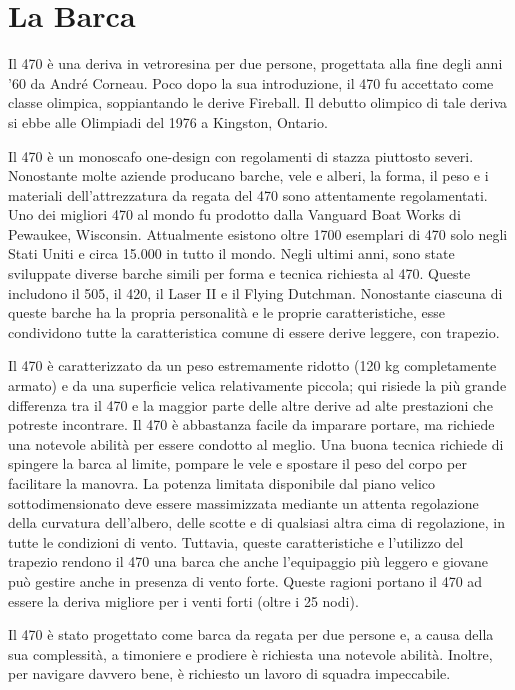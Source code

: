
\section{La Barca}
\label{sec:LaBarca}
Il 470 è una deriva in vetroresina per due persone, progettata alla fine degli
anni '60 da André Corneau. Poco dopo la sua introduzione, il 470 fu accettato
come classe olimpica, soppiantando le derive Fireball. Il
debutto olimpico di tale deriva si ebbe alle Olimpiadi del 1976 a Kingston,
Ontario.

Il 470 è un monoscafo one-design con regolamenti di stazza piuttosto severi.
Nonostante molte aziende producano barche, vele e alberi, la forma, il peso e i
materiali dell'attrezzatura da regata del 470 sono attentamente regolamentati.
Uno dei migliori 470 al mondo fu prodotto dalla Vanguard Boat Works di Pewaukee,
Wisconsin. Attualmente esistono oltre 1700 esemplari di 470 solo negli Stati Uniti e circa 15.000
in tutto il mondo. Negli ultimi anni, sono state sviluppate diverse barche
simili per forma e tecnica richiesta al 470. Queste includono il 505, il 420, il
Laser II e il Flying Dutchman. Nonostante ciascuna di queste barche ha la
propria personalità e le proprie caratteristiche, esse condividono tutte la caratteristica comune di
essere derive leggere, con trapezio.

Il 470 è caratterizzato da un peso estremamente ridotto (120 kg completamente armato) e da una superficie velica
relativamente piccola; qui risiede la più grande differenza tra il 470 e la
maggior parte delle altre derive ad alte prestazioni che potreste incontrare. Il
470 è abbastanza facile da imparare portare, ma richiede una notevole
abilità per essere condotto al meglio. Una buona tecnica richiede di spingere la
barca al limite, pompare le vele e spostare il peso del corpo per facilitare la manovra.
La potenza limitata disponibile dal piano velico sottodimensionato deve essere
massimizzata mediante un attenta regolazione della curvatura dell'albero,
delle scotte e di qualsiasi altra cima di regolazione, in tutte le condizioni di
vento. Tuttavia, queste caratteristiche e l'utilizzo del trapezio rendono il 470
una barca che anche l'equipaggio più leggero e giovane può gestire anche in
presenza di vento forte. Queste ragioni portano il 470 ad essere la deriva migliore per i venti
forti (oltre i 25 nodi).

Il 470 è stato progettato come barca da regata per due persone e, a causa della
sua complessità, a timoniere e prodiere è richiesta una notevole
abilità. Inoltre, per navigare davvero bene, è richiesto un lavoro di squadra
impeccabile.

